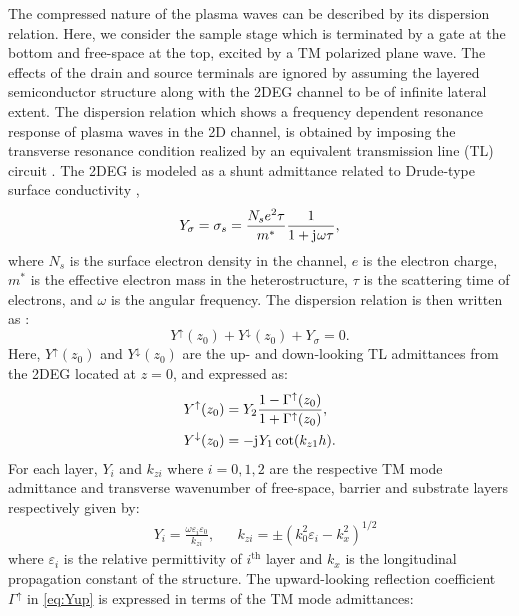 \documentclass[10pt]{article}
\renewcommand{\^}{\hat}  %
\renewcommand{\O}{\omega}  %
\newcommand{\E}{\varepsilon}  %
\renewcommand{\^}{\hat}  %
\renewcommand{\j}{\mathrm{j}\mkern1mu} %
\begin{document}
The compressed nature of the plasma waves can be described by its dispersion relation. Here, we consider the sample stage which is terminated by a gate at the bottom and free-space at the top, excited by a $\mathrm{TM}$ polarized plane wave. The effects of the drain and source terminals are ignored by assuming the layered semiconductor structure along with the 2DEG channel to be of infinite lateral extent. The dispersion relation which shows a frequency dependent resonance response of plasma waves in the 2D channel, is obtained by imposing the transverse resonance condition realized by an equivalent transmission line (TL) circuit \cite{Kastner_1988,Michalski2005}. The 2DEG is modeled as a shunt admittance related to Drude-type surface conductivity \cite{Burke2000},
%
\begin{equation}
  Y_{\sigma} = \sigma_s = \frac{N_s e^2 \tau}{m^{\ast}}\frac{1}{1 + \j \O \tau},
  \label{eq:Y2deg}
\end{equation}
%
where $N_s$ is the surface electron density in the channel, $e$ is the electron charge, $m^{\ast}$ is the effective electron mass in the heterostructure, $\tau$ is the scattering time of electrons, and $\O$ is the angular frequency. The dispersion relation is then written as \cite{Gomez-Diaz2012}:
%
\begin{equation}
  Y^{\uparrow}(z_0) + Y^{\downarrow}(z_0) + Y_{\sigma} = 0.
  \label{eq:dispersion}
\end{equation}
%
Here, $Y^{\uparrow}(z_0)$ and $Y^{\downarrow}(z_0)$ are the up- and down-looking TL admittances from the 2DEG located at $z = 0$, and expressed as:
%
\begin{subequations}
  \begin{align}
    Y^{\uparrow}(z_0) &=  Y_2 \frac{1 - \Gamma^{\uparrow}(z_0)}{1 + \Gamma^{\uparrow}(z_0)},
    \label{eq:Yup} \\
    Y^{\downarrow}(z_0) &=  -\j Y_1 \cot (k_{z1} h).
    \label{eq:Ydown}
  \end{align}
  \label{eq:Y}%
\end{subequations}
%
For each layer, $Y_{i}$ and $k_{zi}$ where $i = 0,1,2$ are the respective TM mode admittance and transverse wavenumber of free-space, barrier and substrate layers respectively given by:
%
\begin{align}
  & Y_i = \frac{\O \E_i \E_0}{k_{zi}}, && k_{zi} = \pm \left( k_0^2 \E_i - k_x^2 \right)^{1/2}
  \label{eq:Yandk}
\end{align}
%
where $\E_i$ is the relative permittivity of $i^{\text{th}}$ layer and $k_x$ is the longitudinal propagation constant of the structure. The upward-looking reflection coefficient $\Gamma^{\uparrow}$ in \eqref{eq:Yup} is expressed in terms of the TM mode admittances:
\end{document}
